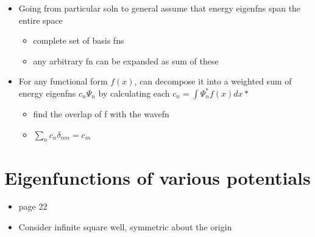 \documentclass[a4paper,11pt,normalem]{article}
\begin{document}
\begin{itemize}
\item
  Going from particular soln to general assume that energy eigenfns span
  the entire space
  \begin{itemize}
  \item
    complete set of basis fns
  \item
    any arbitrary fn can be expanded as sum of these
  \end{itemize}
\item
  For any functional form \(f(x)\), can decompose it into a weighted sum
  of energy eigenfns \(c_n \Psi_n\) by calculating each
  \(c_n = \int \Psi_{n}^{*}f(x)dx*\)
  \begin{itemize}
  \item
    find the overlap of f with the wavefn
  \item
    \(\sum_{n} c_n \delta_{nm} = c_m\)
  \end{itemize}
\end{itemize}

\section{Eigenfunctions of various potentials}\label{eigenfunctions-of-various-potentials}

\begin{itemize}
\item
  page 22
\item
  Consider infinite square well, symmetric about the origin
\end{itemize}
\end{document}
